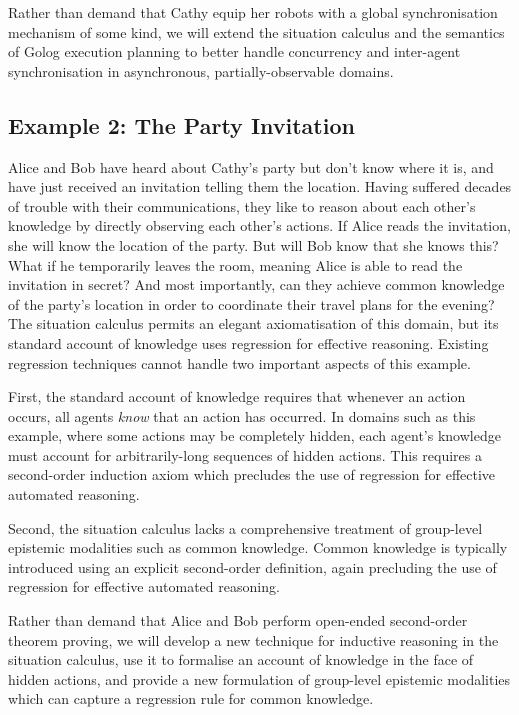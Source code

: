 Rather than demand that Cathy equip her robots with a global synchronisation
mechanism of some kind, we will extend the situation calculus and
the semantics of Golog execution planning to better handle concurrency
and inter-agent synchronisation in asynchronous, partially-observable
domains.


\subsection*{Example 2: The Party Invitation}

Alice and Bob have heard about Cathy's party but don't know where
it is, and have just received an invitation telling them the location.
Having suffered decades of trouble with their communications, they
like to reason about each other's knowledge by directly observing
each other's actions. If Alice reads the invitation, she will know
the location of the party. But will Bob know that she knows this?
What if he temporarily leaves the room, meaning Alice is able to read
the invitation in secret? And most importantly, can they achieve common
knowledge of the party's location in order to coordinate their travel
plans for the evening?\\


The situation calculus permits an elegant axiomatisation of this domain,
but its standard account of knowledge uses regression for effective
reasoning. Existing regression techniques cannot handle two important
aspects of this example.

First, the standard account of knowledge requires that whenever an
action occurs, all agents \emph{know} that an action has occurred.
In domains such as this example, where some actions may be completely
hidden, each agent's knowledge must account for arbitrarily-long sequences
of hidden actions. This requires a second-order induction axiom which
precludes the use of regression for effective automated reasoning.

Second, the situation calculus lacks a comprehensive treatment of
group-level epistemic modalities such as common knowledge. Common
knowledge is typically introduced using an explicit second-order definition,
again precluding the use of regression for effective automated reasoning.

Rather than demand that Alice and Bob perform open-ended second-order
theorem proving, we will develop a new technique for inductive reasoning
in the situation calculus, use it to formalise an account of knowledge
in the face of hidden actions, and provide a new formulation of group-level
epistemic modalities which can capture a regression rule for common
knowledge.


